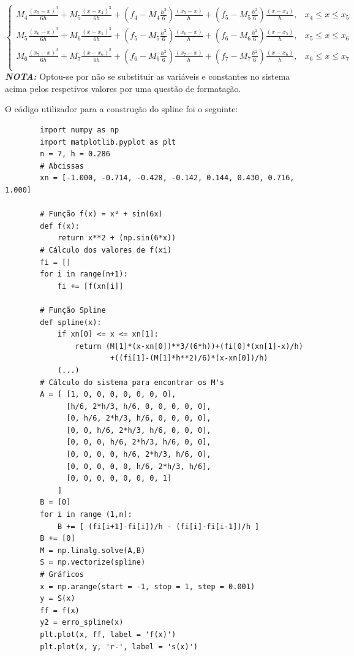 \documentclass[12pt, letterpaper,fleqn]{article}
\begin{document}
\begin{itemize}
\begin{equation}
\begin{cases}
            M_4\frac{(x_5 - x)^3}{6h} + M_5\frac{(x-x_4)^3}{6h}+(f_4 - M_4\frac{h^2}{6})\frac{(x_5 - x)}{h} + (f_5 - M_5\frac{h^2}{6}) \frac{(x-x_4)}{h}, & x_4 \leq x \leq x_5 \\
            
            M_5\frac{(x_6 - x)^3}{6h} + M_6\frac{(x-x_5)^3}{6h}+(f_5 - M_5\frac{h^2}{6})\frac{(x_6 - x)}{h} + (f_6 - M_6\frac{h^2}{6}) \frac{(x-x_5)}{h}, & x_5 \leq x \leq x_6 \\
            
            M_6\frac{(x_7 - x)^3}{6h} + M_7\frac{(x-x_6)^3}{6h}+(f_6 - M_6\frac{h^2}{6})\frac{(x_7 - x)}{h} + (f_7 - M_7\frac{h^2}{6}) \frac{(x-x_6)}{h}, & x_6 \leq x \leq x_7 \\
        \end{cases}    
    \end{equation}
    \textbf{\textit{NOTA:}} Optou-se por não se substituir as variáveis e constantes no sistema acima pelos respetivos valores por uma questão de formatação.
    
    O código utilizador para a construção do spline foi o seguinte:
    \begin{verbatim}
        import numpy as np
        import matplotlib.pyplot as plt 
        n = 7, h = 0.286
        # Abcissas
        xn = [-1.000, -0.714, -0.428, -0.142, 0.144, 0.430, 0.716, 1.000]
        
        # Função f(x) = x² + sin(6x)
        def f(x):
            return x**2 + (np.sin(6*x))
        # Cálculo dos valores de f(xi)
        fi = []
        for i in range(n+1):
            fi += [f(xn[i]]
        
        # Função Spline
        def spline(x):
            if xn[0] <= x <= xn[1]:
                return (M[1]*(x-xn[0])**3/(6*h))+(fi[0]*(xn[1]-x)/h) 
                        +((fi[1]-(M[1]*h**2)/6)*(x-xn[0])/h)
            (...)
        # Cálculo do sistema para encontrar os M's
        A = [ [1, 0, 0, 0, 0, 0, 0, 0],
              [h/6, 2*h/3, h/6, 0, 0, 0, 0, 0],
              [0, h/6, 2*h/3, h/6, 0, 0, 0, 0],
              [0, 0, h/6, 2*h/3, h/6, 0, 0, 0],
              [0, 0, 0, h/6, 2*h/3, h/6, 0, 0],
              [0, 0, 0, 0, h/6, 2*h/3, h/6, 0],
              [0, 0, 0, 0, 0, h/6, 2*h/3, h/6],
              [0, 0, 0, 0, 0, 0, 0, 1]                                
            ]
        B = [0]
        for i in range (1,n):
            B += [ (fi[i+1]-fi[i])/h - (fi[i]-fi[i-1])/h ]
        B += [0]
        M = np.linalg.solve(A,B)
        S = np.vectorize(spline)
        # Gráficos
        x = np.arange(start = -1, stop = 1, step = 0.001)
        y = S(x)
        ff = f(x)
        y2 = erro_spline(x)
        plt.plot(x, ff, label = 'f(x)')
        plt.plot(x, y, 'r-', label = 's(x)')
    \end{verbatim}


\end{itemize}
\end{document}
